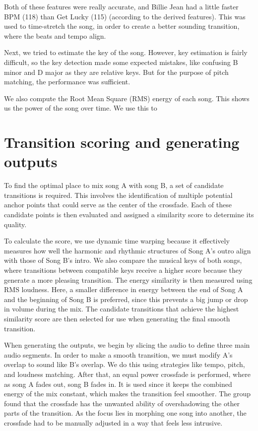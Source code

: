 \documentclass[14pt]{extarticle}
\begin{document}
Both of these features were really accurate, and Billie Jean had a little faster BPM (118) than Get Lucky (115) (according to the derived features). This was used to time-stretch the song, in order to create a better sounding transition, where the beats and tempo align.

Next, we tried to estimate the key of the song. However, key estimation is fairly difficult, so the key detection made some expected mistakes, like confusing B minor and D major as they are relative keys. But for the purpose of pitch matching, the performance was sufficient.

We also compute the Root Mean Square (RMS) energy of each song. This shows us the power of the song over time. We use this to 


\section{Transition scoring and generating outputs}

To find the optimal place to mix song A with song B, a set of candidate transitions is required. This involves the identification of multiple potential anchor points that could serve as the center of the crossfade. Each of these candidate points is then evaluated and assigned a similarity score to determine its quality. 

To calculate the score, we use dynamic time warping because it effectively measures how well the harmonic and rhythmic structures of Song A's outro align with those of Song B's intro. We also compare the musical keys of both songs, where transitions between compatible keys receive a higher score because they generate a more pleasing transition. The energy similarity is then measured using RMS loudness. Here, a smaller difference in energy between the end of Song A and the beginning of Song B is preferred, since this prevents a big jump or drop in volume during the mix. The candidate transitions that achieve the highest similarity score are then selected for use when generating the final smooth transition.

When generating the outputs, we begin by slicing the audio to define three main audio segments. In order to make a smooth transition, we must modify A's overlap to sound like B's overlap. We do this using strategies like tempo, pitch, and loudness matching. After that, an equal power crossfade is performed, where as song A fades out, song B fades in. It is used since it keeps the combined energy of the mix constant, which makes the transition feel smoother. The group found that the crossfade has the unwanted ability of overshadowing the other parts of the transition. As the focus lies in morphing one song into another, the crossfade had to be manually adjusted in a way that feels less intrusive.
\end{document}
